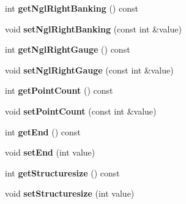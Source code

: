 \begin{DoxyCompactItemize}
\item 
\hypertarget{classDatapackage_a08f8cbb9982d62be35cc136ac0572f32}{int {\bfseries get\-Ngl\-Right\-Banking} () const }\label{classDatapackage_a08f8cbb9982d62be35cc136ac0572f32}

\item 
\hypertarget{classDatapackage_ac4fd59abddf395ad388d5655b2c9f11c}{void {\bfseries set\-Ngl\-Right\-Banking} (const int \&value)}\label{classDatapackage_ac4fd59abddf395ad388d5655b2c9f11c}

\item 
\hypertarget{classDatapackage_a519c74c74ff0ba425c331a46710c4272}{int {\bfseries get\-Ngl\-Right\-Gauge} () const }\label{classDatapackage_a519c74c74ff0ba425c331a46710c4272}

\item 
\hypertarget{classDatapackage_a52e4c6d14809f20dccd1e2ffba21827e}{void {\bfseries set\-Ngl\-Right\-Gauge} (const int \&value)}\label{classDatapackage_a52e4c6d14809f20dccd1e2ffba21827e}

\item 
\hypertarget{classDatapackage_a746b186c1f8293a39866ae7e89bd1915}{int {\bfseries get\-Point\-Count} () const }\label{classDatapackage_a746b186c1f8293a39866ae7e89bd1915}

\item 
\hypertarget{classDatapackage_aa2fa86907ea6cc19f16f4ecf5553a39a}{void {\bfseries set\-Point\-Count} (const int \&value)}\label{classDatapackage_aa2fa86907ea6cc19f16f4ecf5553a39a}

\item 
\hypertarget{classDatapackage_a8e1cd6fcc6cf979190b41dfe98065563}{int {\bfseries get\-End} () const }\label{classDatapackage_a8e1cd6fcc6cf979190b41dfe98065563}

\item 
\hypertarget{classDatapackage_abfef2d431bf688a23cf9cd8654aabf6e}{void {\bfseries set\-End} (int value)}\label{classDatapackage_abfef2d431bf688a23cf9cd8654aabf6e}

\item 
\hypertarget{classDatapackage_a19d6efa99fb9a217950f67ee26951097}{int {\bfseries get\-Structuresize} () const }\label{classDatapackage_a19d6efa99fb9a217950f67ee26951097}

\item 
\hypertarget{classDatapackage_a1ede7123986211b5a28ee35d0e1ad329}{void {\bfseries set\-Structuresize} (int value)}\label{classDatapackage_a1ede7123986211b5a28ee35d0e1ad329}


\end{DoxyCompactItemize}

